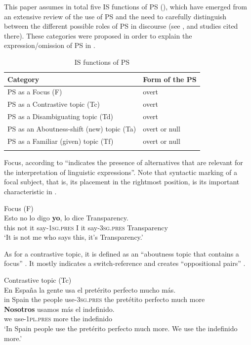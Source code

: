 \documentclass[output=paper]{langsci/langscibook}
\begin{document}
This paper assumes in total five IS functions of PS (), which have emerged from an extensive review of the use of PS and the need to carefully distinguish between the different possible roles of PS in discourse (see \citealt{Peskova2014,Peskova.2015}, and studies cited there). These categories were proposed in order to explain the expression/omission of PS in .

\begin{table}
 \caption{IS functions of PS}
\label{extab:pes:4}
\begin{tabular}{ll}
\lsptoprule
             Category &             Form of the PS\\
\midrule
     PS as a Focus (F)   &          overt\\
     PS as a Contrastive topic (Tc)   &      overt\\
     PS as a Disambiguating topic (Td)  &     overt\\
     PS as an Aboutness-shift (new) topic (Ta)  &   overt or null\\
     PS as a Familiar (given) topic (Tf)  &     overt or null\\
\lspbottomrule
\end{tabular}
\end{table}

Focus, according to \citet[18]{Krifka2007} ``indicates the presence of alternatives that are relevant for the interpretation of linguistic expressions''. Note that syntactic marking of a focal subject, that is, its placement in the rightmost position, is its important characteristic in  .


\ea\label{ex:pes:5}
             Focus (F)\\
\gll Esto  no  lo  digo \textbf{{yo}},  lo  dice     Transparency.\\
       this  not  it  say-\textsc{1sg}.\textsc{pres}   I it   say-\textsc{3sg}.\textsc{pres} Transparency\\
\glt ‘It is not me who says this, it’s Transparency.’
\z

As for a contrastive topic, it is defined as an ``aboutness topic that contains a focus'' \citep[44]{Krifka2007}. It mostly indicates a switch-reference and creates ``oppositional pairs'' \citep[143]{Chocano2012} .


\ea\label{ex:pes:6}
             Contrastive topic (Tc)\\
\gll En Espa{\~n}a    la gente  usa     el pretérito perfecto mucho más.\\
     in Spain    the people  use-\textsc{3sg}.\textsc{pres} the pretétito perfecto  much more\\
\gll     \textbf{{Nosotros}} usamos    más    el indefinido.\\
         we    use-\textsc{1pl}.\textsc{pres} more    the indefinido\\
\glt ‘In Spain people use the pretérito perfecto much more. We use the indefinido more.’
\z
\end{document}

